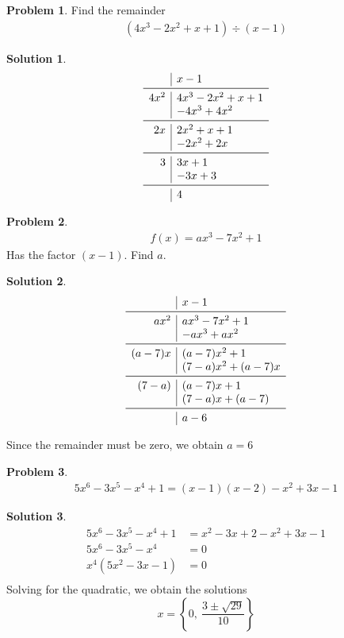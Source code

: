 \documentclass[a4paper]{article}
\theoremstyle{definition}
\newtheorem{problem}{Problem}[section]
\newtheorem*{solution}{Solution}
\begin{document}
\begin{problem}
Find the remainder
\begin{align*}
(4x^3 -2x^2 +x +1) \div  (x-1)
\end{align*}
\end{problem}

\begin{solution}
\[
\begin{array}{r|l}
& x-1 \\
\midrule
4x^2  & 4x^3 -2x^2 +x +1 \\
& -4x^3 + 4x^2 \\
\midrule
2x & 2x^2 +x +1 \\
& -2x^2 + 2x \\
\midrule
3 & 3x+1 \\
& -3x + 3 \\
\midrule
&4
\end{array}
\]
\end{solution}


\begin{problem}
\begin{align*}
f(x) = ax^3 -7x^2 +1
\end{align*}
Has the factor \((x-1)\). Find \(a\).
\end{problem}

\begin{solution}
\[
\begin{array}{r|l}
& x-1 \\
\midrule
ax^2 & ax^3 - 7x^2 +1 \\
& -ax^3 + ax^2 \\
\midrule
(a-7)x & (a-7)x^2 +1 \\
& (7-a)x^2 + (a-7)x \\
\midrule
(7-a) & (a-7)x +1 \\
& (7-a)x + (a-7) \\
\midrule
& a -6
\end{array}
\]

Since the remainder must be zero, we obtain \(a=6\)
\end{solution}

\begin{problem}
\begin{align*}
5x^6 -3x^5 -x^4 +1  = (x-1)(x-2) - x^2 +3x -1
\end{align*}
\end{problem}

\begin{solution}
\begin{align*}
5x^6 -3x^5 -x^4 + 1 &= x^2 -3x +2 -x^2 +3x -1 \\
5x^6 -3x^5 -x^4 &= 0 \\
x^4(5x^2 -3x -1) &= 0 \\
\end{align*}
Solving for the quadratic, we obtain the solutions 
\[
x= \left\{0,\ \frac{3 \pm \sqrt{29}}{10} \right\}
\]
\end{solution}
\end{document}
